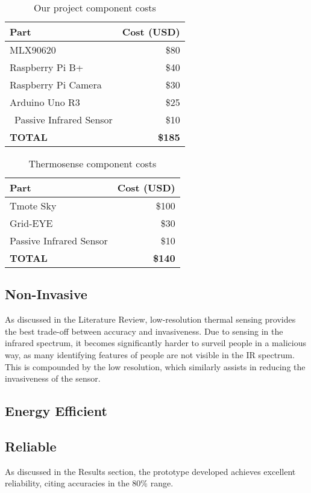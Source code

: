 \documentclass[../thesis/thesis.tex]{subfiles}
\begin{document}
\begin{table}
\centering
\begin{tabular}[H]{|l|r|}
\hline
\textbf{Part} & \textbf{Cost (USD)} \\ \hline
MLX90620 & \$80 \\ \hline
Raspberry Pi B+ &  \$40 \\ \hline
Raspberry Pi Camera &  \$30 \\ \hline
Arduino Uno R3 & \$25 \\ \
Passive Infrared Sensor & \$10 \\ \hline
\textbf{TOTAL} & \textbf{\$185} \\ \hline
\end{tabular}
\caption{Our project component costs}
\label{tab:sensor:cost}
\end{table}

\begin{table}
\centering
\begin{tabular}[H]{|l|r|}
\hline
\textbf{Part} & \textbf{Cost (USD)} \\ \hline
Tmote Sky & \$100 \\ \hline
Grid-EYE & \$30 \\ \hline
Passive Infrared Sensor & \$10 \\ \hline
\textbf{TOTAL} & \textbf{\$140} \\ \hline
\end{tabular}
\caption{Thermosense component costs}
\label{tab:sensor:thermosensecost}
\end{table}

\subsection{Non-Invasive}
As discussed in the Literature Review, low-resolution thermal sensing provides the best trade-off between accuracy and invasiveness. Due to sensing in the infrared spectrum, it becomes significantly harder to surveil people in a malicious way, as many identifying features of people are not visible in the IR spectrum. This is compounded by the low resolution, which similarly assists in reducing the invasiveness of the sensor.

\subsection{Energy Efficient}


\subsection{Reliable}
As discussed in the Results section, the prototype developed achieves excellent reliability, citing accuracies in the 80\% range. 
\end{document}

